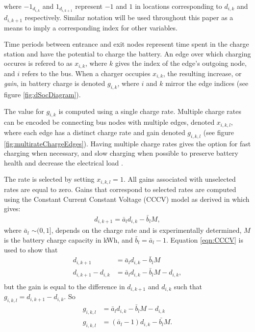 where $-1_{d_{i,k}}$ and $1_{d_{i,k+1}}$ represent $-1$ and $1$ in locations corresponding to $d_{i,k}$ and $d_{i,k+1}$ respectively. Similar notation will be used throughout this paper as a means to imply a corresponding index for other variables.
\par Time periods between entrance and exit nodes represent time spent in the charge station and have the potential to charge the battery. An edge over which charging occures is refered to as $x_{i,k}$, where $k$ gives the index of the edge's outgoing node, and $i$ refers to the bus.  When a charger occupies $x_{i,k}$, the resulting increase, or \textit{gain}, in battery charge is denoted $g_{i,k}$, where $i$ and $k$ mirror the edge indices (see figure \ref{fig:dSocDiagram}). 
\par The value for $g_{i,k}$ is computed using a single charge rate. Multiple charge rates can be encoded be connecting bus nodes with multiple edges, denoted $x_{i,k,l}$, where each edge has a distinct charge rate and gain denoted $g_{i,k,l}$ (see figure \ref{fig:multirateChargeEdges}). Having multiple charge rates gives the option for fast charging when necessary, and slow charging when possible to preserve battery health and decrease the electrical load \cite{houbbadi_optimal_2019}.


\par The rate is selected by setting $x_{i,k,l} = 1$. All gains associated with unselected rates are equal to zero. Gains that correspond to selected rates are computed using the Constant Current Constant Voltage (CCCV) model as derived in \cite{whitaker_network_2021} which gives:
\begin{align}\label{eqn:CCCV}
	d_{i,k+1} = \bar{a}_ld_{i,k} - \bar{b}_lM, 
\end{align}
where $\bar{a}_l$ $\sim(0,1]$, depends on the charge rate and is experimentally determined, $M$ is the battery charge capacity in kWh, and $\bar{b}_l = \bar{a}_l - 1$.
Equation \ref{eqn:CCCV} is used to show that
\begin{equation}\label{eqn:g}
\begin{aligned}
	d_{i,k+1} &= \bar{a}_ld_{i,k} - \bar{b}_lM \\ 
	d_{i,k+1} - d_{i,k} &= \bar{a}_ld_{i,k} - \bar{b}_lM - d_{i,k},\\
\end{aligned}
\end{equation}
but the gain is equal to the difference in $d_{i,k+1}$ and $d_{i,k}$ such that $g_{i,k,l} = d_{i,k+1} - d_{i,k}$.  So
\begin{equation}\label{eqn:CCCVFinal}
\begin{aligned}
	g_{i,k,l}  &= \bar{a}_ld_{i,k} - \bar{b}_lM - d_{i,k}\\
	g_{i,k,l}  &= (\bar{a}_l - 1)d_{i,k} - \bar{b_l}M.\\
\end{aligned}
\end{equation}

